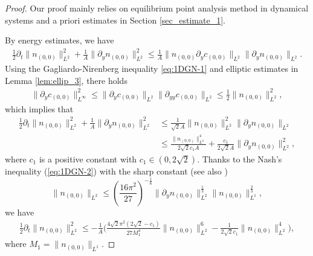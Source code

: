 \documentclass[12pt, reqno]{amsart}
\numberwithin{equation}{section}
\begin{document}
	\begin{proof}
		Our proof mainly relies on equilibrium point analysis method in dynamical systems and a priori estimates in Section \ref{sec_estimate_1}.
		
		By energy estimates, we have 
		\begin{equation*}
			\begin{aligned}
				\frac{1}{2}\partial_t\|n_{(0,0)}\|^2_{L^2}
				+\frac{1}{A}\|\partial_{y} n_{(0,0)}\|^2_{L^2}
				\leq \frac{1}{A}
				\|n_{(0,0)}\partial_{y}c_{(0,0)}\|_{L^2}\|\partial_{y}n_{(0,0)}\|_{L^2}.
			\end{aligned}
		\end{equation*}
		Using the Gagliardo-Nirenberg inequality \eqref{eq:1DGN-1} and elliptic estimates in Lemma \ref{lem:ellip_3}, there holds
		\begin{align*}
			\|\partial_{y}c_{(0,0)}\|_{L^{\infty}}^2\leq 
			\|\partial_{y}c_{(0,0)}\|_{L^{2}}
			\|\partial_{yy}c_{(0,0)}\|_{L^{2}}
			\leq \frac{1}{2}\|n_{(0,0)}\|_{L^{2}}^2,
		\end{align*} 
		which implies that 
		\begin{equation}\label{eq:c1}
			\begin{aligned}
				\frac{1}{2}\partial_t\|n_{(0,0)}\|^2_{L^2}
				+\frac{1}{A}\|\partial_{y} n_{(0,0)}\|^2_{L^2}
				&\leq \frac{1}{\sqrt{2}A}
				\|n_{(0,0)}\|^2_{L^2}\|\partial_{y}n_{(0,0)}\|_{L^2}\\
				&\leq\frac{\|n_{(0,0)}\|^4_{L^2}}{2\sqrt{2}c_1A}+\frac{c_1}{2\sqrt{2}A}\|\partial_{y} n_{(0,0)}\|^2_{L^2},
			\end{aligned}
		\end{equation}
		where $c_1$ is a positive constant with $c_1\in(0,2\sqrt{2}).$
		Thanks to the Nash's inequality (\ref{eq:1DGN-2}) with the sharp constant (see also \cite{LW1,Na1})
		$$\|n_{(0,0)}\|_{L^2}\leq \left(\frac{16\pi^2}{27}\right)^{-\frac{1}{6}}
		\|\partial_yn_{(0,0)}\|_{L^2}^{\frac{1}{3}}
		\|n_{(0,0)}\|_{L^1}^{\frac{2}{3}},$$
		we have 
		\begin{equation}\label{n00_proof_1}
			\begin{aligned}
				\frac{1}{2}\partial_t\|n_{(0,0)}\|^2_{L^2}\leq 
				-\frac{1}{A}\Big(\frac{4\sqrt{2}\pi^2(2\sqrt{2}-c_1)}{27M_1^4}\|n_{(0,0)}\|_{L^2}^6-\frac{1}{2\sqrt{2}c_1}\|n_{(0,0)}\|^4_{L^2}\Big),
			\end{aligned}
		\end{equation}
		where $M_1=\|n_{(0,0)}\|_{L^1}.$
		

\end{proof}
\end{document}
